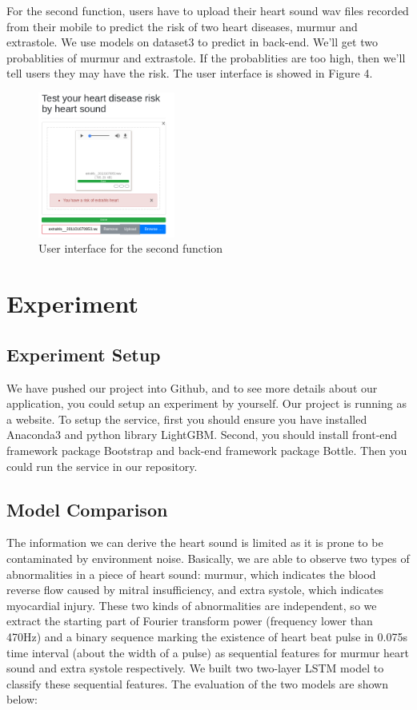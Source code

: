 \documentclass[letterpaper]{article} %
\begin{document}
For the second function, users have to upload their heart sound wav files recorded from their mobile to predict the risk of two heart diseases, murmur and extrastole. We use models on dataset3 to predict in back-end. We'll get two probablities of murmur and extrastole. If the probablities are too high, then we'll tell users they may have the risk. The user interface is showed in Figure 4.
\begin{figure}[!htbp]
\centering\includegraphics[width=0.4\textwidth]{dataset-3-ui}
\caption{User interface for the second function}
\label{fig:dataset-3-ui}
\end{figure}
\section{Experiment}

\subsection{Experiment Setup}
We have pushed our project into Github, and to see more details about our application, you could setup an experiment by yourself. Our project is running as a website. To setup the service, first you should ensure you have installed Anaconda3 and python library LightGBM. Second, you should install front-end framework package Bootstrap and back-end framework package Bottle. Then you could run the service in our repository.

\subsection{Model Comparison}

The information we can derive the heart sound is limited as it is prone to be contaminated by environment noise. Basically, we are able to observe two types of abnormalities in a piece of heart sound: murmur, which indicates the blood reverse flow caused by mitral insufficiency, and extra systole, which indicates myocardial injury. These two kinds of abnormalities are independent, so we extract the starting part of Fourier transform power (frequency lower than 470Hz) and a binary sequence marking the existence of heart beat pulse in 0.075s time interval (about the width of a pulse) as sequential features for murmur heart sound and extra systole respectively. We built two two-layer LSTM model to classify these sequential features. The evaluation of the two models are shown below:
\end{document}
